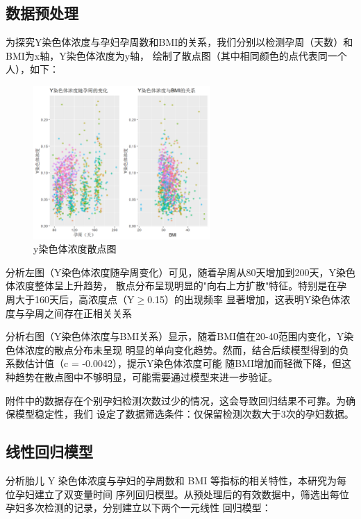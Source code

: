 \documentclass{article}
\begin{document}
\subsection{\textbf{数据预处理}}
为探究Y染色体浓度与孕妇孕周数和BMI的关系，我们分别以检测孕周（天数）和BMI为x轴，Y染色体浓度为y轴，
绘制了散点图（其中相同颜色的点代表同一个人），如下：
\begin{figure}[H]  %
    \centering  %
    \includegraphics[width=0.6\textwidth]{graph/sss.png}  %
    \caption{y染色体浓度散点图}  %
    \label{fig:single}  %
\end{figure}
分析左图（Y染色体浓度随孕周变化）可见，随着孕周从80天增加到200天，Y染色体浓度整体呈上升趋势，
散点分布呈现明显的"向右上方扩散"特征。特别是在孕周大于160天后，高浓度点（Y$\geq$0.15）的出现频率
显著增加，这表明Y染色体浓度与孕周之间存在正相关关系

分析右图（Y染色体浓度与BMI关系）显示，随着BMI值在20-40范围内变化，Y染色体浓度的散点分布未呈现
明显的单向变化趋势。然而，结合后续模型得到的负系数估计值（c = -0.0042），提示Y染色体浓度可能
随BMI增加而轻微下降，但这种趋势在散点图中不够明显，可能需要通过模型来进一步验证。

附件中的数据存在个别孕妇检测次数过少的情况，这会导致回归结果不可靠。为确保模型稳定性，我们
设定了数据筛选条件：仅保留检测次数大于3次的孕妇数据。
\subsection{\textbf{线性回归模型}}
分析胎儿 Y 染色体浓度与孕妇的孕周数和 BMI 等指标的相关特性，本研究为每位孕妇建立了双变量时间
序列回归模型。从预处理后的有效数据中，筛选出每位孕妇多次检测的记录，分别建立以下两个一元线性
回归模型：
\end{document}
